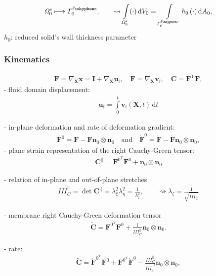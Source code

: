 \documentclass[a4paper,12pt]{report}
\newcommand{\fS}{\text{s}}
\newcommand{\fF}{\text{f}}
\newcommand{\bs}[1]{\boldsymbol{#1}}
\newcommand{\Om}{\mathit{\Omega}}
\newcommand{\Gm}{\mathit{\Gamma}}
\newcommand{\vf}{\bs{v}_{\fF}} %
\newcommand{\uf}{\bs{u}_{\fF}} %
\begin{document}
\begin{align}
\Om_{0}^{\fS} \longmapsto \Gm_{0}^{\mathrm{\fF\mhyphen\fS}}, \qquad \rightsquigarrow \int\limits_{\Om_{0}^{\fS}}(\cdot)\,\mathrm{d}V_0 = \int\limits_{\Gm_{0}^{\mathrm{\fF\mhyphen\fS}}}h_{0}\,(\cdot)\,\mathrm{d}A_0, \label{eq:omega_to_gamma}
\end{align}
$h_{0}$: reduced solid's wall thickness parameter

\subsubsection{Kinematics}
\begin{align}
    \bs{F} = \nabla_{\bs{X}}\bs{x} = \bs{I} + \nabla_{\bs{X}}\uf, \quad \dot{\bs{F}} = \nabla_{\bs{X}}\vf, \quad \bs{C} = \bs{F}^{\mathrm{T}}\bs{F}, \label{eq:defgrad_mem}
\end{align}
- fluid domain displacement:
\begin{align}
\uf = \int\limits_{0}^{t} \vf(\bs{X},t)\,\mathrm{d}t \label{eq:ufluid}
\end{align}

- in-plane deformation and rate of deformation gradient:
\begin{align}
    \bs{F}^{0} = \bs{F}-\bs{F}\bs{n}_0\otimes\bs{n}_0 \quad \text{and} \quad \dot{\bs{F}}^{0} = \dot{\bs{F}}-\dot{\bs{F}}\bs{n}_0\otimes\bs{n}_0, \label{eq:F0F0dot}
\end{align}
- plane strain representation of the right Cauchy-Green tensor:
\begin{align}
    \bs{C}^{||} = \bs{F}^{0^\mathrm{T}}\bs{F}^{0} + \bs{n}_0\otimes\bs{n}_0 \label{eq:Cplane}
\end{align}

- relation of in-plane and out-of-plane stretches
\begin{align}
    I\!\!I\!\!I_{C}^{||} = \det \bs{C}^{||} = \lambda_{\xi}^2 \lambda_{\eta}^2 = \frac{1}{\lambda_{\zeta}^2}, \qquad \rightsquigarrow \lambda_{\zeta} = \frac{1}{\sqrt{I\!\!I\!\!I_{C}^{||}}}\label{eq:detCplane}
\end{align}

- membrane right Cauchy-Green deformation tensor
\begin{align}
    \tilde{\bs{C}} = \bs{F}^{0^\mathrm{T}}\bs{F}^{0} + \frac{1}{I\!\!I\!\!I_{C}^{||}}\bs{n}_0\otimes\bs{n}_0. \label{eq:Cmod}
\end{align}

- rate:
\begin{align}
    \dot{\tilde{\bs{C}}} = \dot{\bs{F}}^{0^\mathrm{T}}\bs{F}^{0} + \bs{F}^{0^\mathrm{T}}\dot{\bs{F}}^{0} - \frac{\dot{I\!\!I\!\!I}_{C}^{||}}{I\!\!I\!\!I_{C}^{||^2}}\bs{n}_0\otimes\bs{n}_0, \label{eq:Cmoddot}
\end{align}
\end{document}
